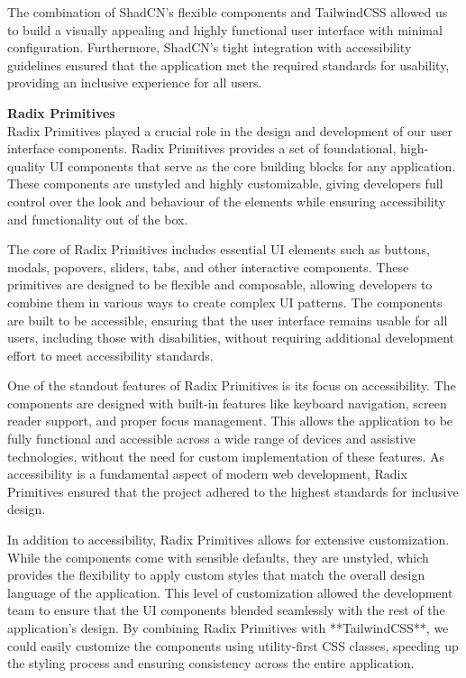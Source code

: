 The combination of ShadCN's flexible components and TailwindCSS allowed us
to build a visually appealing and highly functional user interface with
minimal configuration. Furthermore, ShadCN's tight integration with
accessibility guidelines ensured that the application met the required
standards for usability, providing an inclusive experience for all users.

\vspace{0.5cm}

\textbf{Radix Primitives} \\
Radix Primitives played a crucial role in the design and development of our
user interface components. Radix Primitives provides a set of foundational,
high{-}quality UI components that serve as the core building blocks for any
application. These components are unstyled and highly customizable, giving
developers full control over the look and behaviour of the elements while
ensuring accessibility and functionality out of the box.

The core of Radix Primitives includes essential UI elements such as buttons,
modals, popovers, sliders, tabs, and other interactive components. These
primitives are designed to be flexible and composable, allowing developers
to combine them in various ways to create complex UI patterns. The
components are built to be accessible, ensuring that the user interface
remains usable for all users, including those with disabilities, without
requiring additional development effort to meet accessibility standards.

One of the standout features of Radix Primitives is its focus on
accessibility. The components are designed with built{-}in features like
keyboard navigation, screen reader support, and proper focus management.
This allows the application to be fully functional and accessible across a
wide range of devices and assistive technologies, without the need for
custom implementation of these features. As accessibility is a fundamental
aspect of modern web development, Radix Primitives ensured that the project
adhered to the highest standards for inclusive design.

In addition to accessibility, Radix Primitives allows for extensive
customization. While the components come with sensible defaults, they are
unstyled, which provides the flexibility to apply custom styles that match
the overall design language of the application. This level of customization
allowed the development team to ensure that the UI components blended
seamlessly with the rest of the application's design. By combining Radix
Primitives with **TailwindCSS**, we could easily customize the components
using utility{-}first CSS classes, speeding up the styling process and
ensuring consistency across the entire application.


